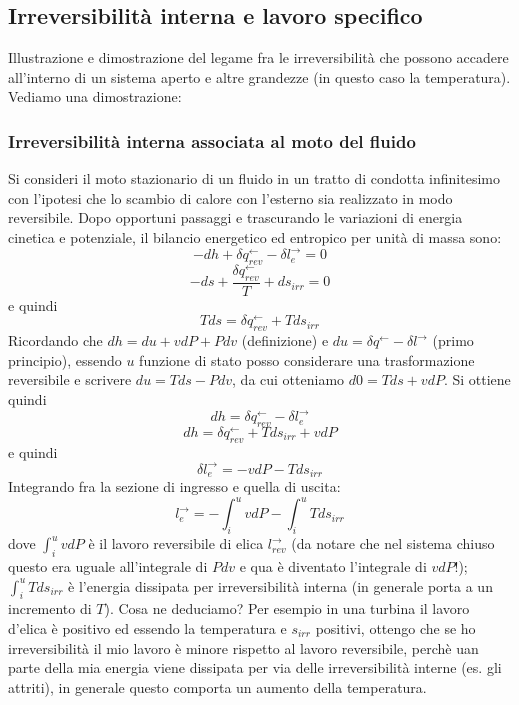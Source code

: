 \subsection{Irreversibilità interna e lavoro specifico}
Illustrazione e dimostrazione del legame fra le irreversibilità che possono accadere all'interno di un sistema aperto e altre grandezze (in questo caso la temperatura). Vediamo una dimostrazione:
\subsubsection{Irreversibilità interna associata al moto del fluido}
Si consideri il moto stazionario di un fluido in un tratto di condotta infinitesimo con l'ipotesi che lo scambio di calore con l'esterno sia realizzato in modo reversibile. Dopo opportuni passaggi e trascurando le variazioni di energia cinetica e potenziale, il bilancio energetico ed entropico per unità di massa sono:
\[
    -dh +\delta q_{rev}^\leftarrow  - \delta l_{e}^\rightarrow  = 0
\]
\[
    - ds + \frac{\delta q_{rev}^\leftarrow }{T} + d s_{irr} = 0
\]
e quindi
\[
    Tds = \delta q_{rev}^\leftarrow  + Tds_{irr}
\]
Ricordando che $dh = du + vdP + Pdv$ (definizione) e $du = \delta q^\leftarrow  - \delta l^\rightarrow $ (primo principio), essendo $u$ funzione di stato posso considerare una trasformazione reversibile e scrivere $du = Tds - Pdv$, da cui otteniamo $d0 = Tds + vdP$.\newline
Si ottiene quindi
\[
    dh = \delta q_{rev}^\leftarrow  - \delta l_{e}^\rightarrow 
\]
\[
    dh = \delta q_{rev}^\leftarrow  + Tds_{irr} + vdP
\]
e quindi
\[
    \delta l_{e}^\rightarrow  = -vdP -Tds_{irr}
\]
Integrando fra la sezione di ingresso e quella di uscita:
\[
    l_e^\rightarrow  = - \int_{i}^{u} vdP - \int_{i}^{u}Tds_{irr}
\]
dove \newline
$\int_{i}^{u} vdP$ è il lavoro reversibile di elica $l_{rev}^\rightarrow $ (da notare che nel sistema chiuso questo era uguale all'integrale di $Pdv$ e qua è diventato l'integrale di $vdP$!);\newline
$\int_{i}^{u}Tds_{irr}$ è l'energia dissipata per irreversibilità interna (in generale porta a un incremento di $T$).\newline
\newline
Cosa ne deduciamo?\newline
Per esempio in una turbina il lavoro d'elica è positivo ed essendo la temperatura e $s_{irr}$ positivi, ottengo che se ho irreversibilità il mio lavoro è minore rispetto al lavoro reversibile, perchè uan parte della mia energia viene dissipata per via delle irreversibilità interne (es. gli attriti), in generale questo comporta un aumento della temperatura.\newline
